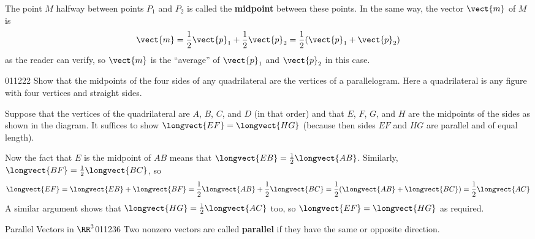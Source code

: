 The point $M$ halfway between points $P_{1}$ and $P_{2}$ is called the \textbf{midpoint} between these points. In the same way, the vector $\vect{m}$ of $M$ is
\begin{equation*}
\vect{m} = \frac{1}{2}\vect{p}_{1} + \frac{1}{2}\vect{p}_{2} = \frac{1}{2}(\vect{p}_{1} + \vect{p}_{2})
\end{equation*}
as the reader can verify, so $\vect{m}$ is the ``average'' of $\vect{p}_{1}$ and $\vect{p}_{2}$ in this case.

\begin{example}{}{011222}
Show  that the midpoints of the four sides of any quadrilateral are the  vertices of a parallelogram. Here a quadrilateral is any figure with  four vertices and straight sides.

\begin{wrapfigure}{l}{5cm} 
	\centering
	
\end{wrapfigure}

 \begin{solution} Suppose that the vertices of the quadrilateral are $A$, $B$, $C$, and $D$ (in that order) and that $E$, $F$, $G$, and $H$ are the midpoints of the sides as shown in the diagram. It suffices to show $\longvect{EF} = \longvect{HG}$
 (because then sides $EF$ and $HG$ are parallel and of equal length). 




\setlength{\rightskip}{0pt plus 200pt} Now the fact that $E$ is the midpoint of $AB$ means that $\longvect{EB} = \frac{1}{2}\longvect{AB}$. Similarly, $\longvect{BF} = \frac{1}{2}\longvect{BC}$, so
\begin{equation*}
 \longvect{EF} = \longvect{EB} + \longvect{BF} = \frac{1}{2}\longvect{AB} + \frac{1}{2}\longvect{BC} = \frac{1}{2}(\longvect{AB} + \longvect{BC}) = \frac{1}{2}\longvect{AC}
\end{equation*}
A similar argument shows that $\longvect{HG} = \frac{1}{2}\longvect{AC}$ too, so $\longvect{EF} = \longvect{HG}$ as required.
\vspace*{2em}
\end{solution}
\end{example}


\begin{definition}{Parallel Vectors in $\RR^3$}{011236}
Two nonzero vectors are called \textbf{parallel} if they have the same or opposite direction.
\end{definition}

